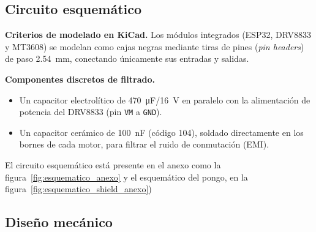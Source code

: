 \subsection{Circuito esquemático}
\begin{visar}
\textbf{Criterios de modelado en KiCad.} Los módulos integrados (ESP32, DRV8833 y MT3608) se modelan como cajas negras mediante tiras de pines (\emph{pin headers}) de paso \SI{2,54}{mm}, conectando únicamente sus entradas y salidas.

\textbf{Componentes discretos de filtrado.}
\begin{itemize}[nosep]
  \item Un capacitor electrolítico de \SI{470}{\micro F}/\SI{16}{V} en paralelo con la alimentación de potencia del DRV8833 (pin \texttt{VM} a \texttt{GND}).
  \item Un capacitor cerámico de \SI{100}{nF} (código 104), soldado directamente en los bornes de cada motor, para filtrar el ruido de conmutación (EMI).
\end{itemize}
\end{visar}

El circuito esquemático está presente en el anexo como la figura~\ref{fig:esquematico_anexo} y el esquemático del pongo, en la figura~\ref{fig:esquematico_shield_anexo})


\subsection{Diseño mecánico}\label{sec:mecanica}


